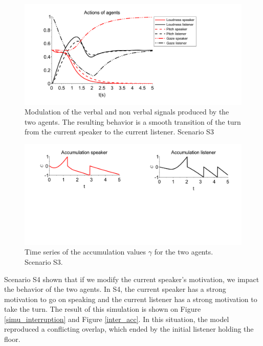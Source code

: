 \begin{figure}
  \centering
  \includegraphics[width=\linewidth]{figure/smooth-transition_signal-production.pdf}
  \caption{Modulation of the verbal and non verbal signals produced by the two agents. The resulting behavior is a smooth transition of the turn from the current speaker to the current listener. Scenario S3} 
  \label{simu_smooth}
\end{figure}

\begin{figure}
  \centering
  \includegraphics[width=\linewidth]{figure/smooth-transition_accumulation.pdf}
  \caption{Time series of the accumulation values $\gamma$ for the two agents. Scenario S3.}
  \label{smooth_acc}
\end{figure}

Scenario S4 shown that if we modify the current speaker's motivation, we impact the behavior of the two agents. In S4, the current speaker has a strong motivation to go on speaking and the current listener has a strong motivation to take the turn. The result of this simulation is shown on Figure \ref{simu_interruption} and  Figure \ref{inter_acc}. In this situation, the model reproduced a conflicting overlap, which ended by the initial listener holding the floor.  

